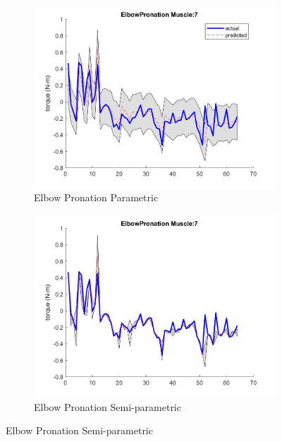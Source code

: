 \begin{figure}[htbp]
    \centering
    \begin{subfigure}[b]{0.45\linewidth}
        \includegraphics[height=0.15\textheight]{Pictures/Results/GPR/ElbowPronation_7Parametric.jpg}
        \caption{Elbow Pronation Parametric}
    \end{subfigure}
    \hfill
    \begin{subfigure}[b]{0.45\linewidth}
        \includegraphics[height=0.15\textheight]{Pictures/Results/GPR/ElbowPronation_7Semiparametric.jpg}
        \caption{Elbow Pronation Semi-parametric}
    \end{subfigure}
    

\end{figure}

